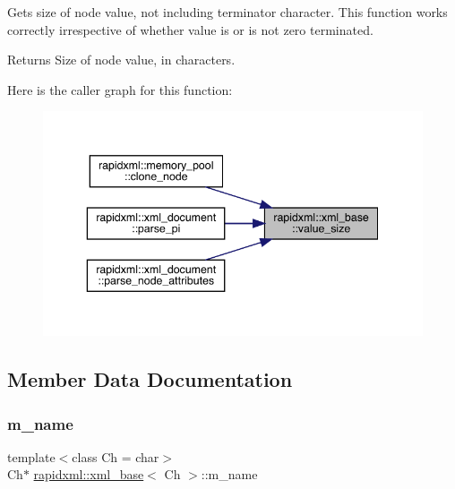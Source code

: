 Gets size of node value, not including terminator character. This function works correctly irrespective of whether value is or is not zero terminated. \begin{DoxyReturn}{Returns}
Size of node value, in characters. 
\end{DoxyReturn}
Here is the caller graph for this function\+:\nopagebreak
\begin{figure}[H]
\begin{center}
\leavevmode
\includegraphics[width=343pt]{classrapidxml_1_1xml__base_a2eb123d471b1567fa4832b6ee2b75493_icgraph}
\end{center}
\end{figure}


\subsection{Member Data Documentation}
\mbox{\label{classrapidxml_1_1xml__base_afd9851ed43e14619db0d7075ef8e9e8a}} 
\subsubsection{\texorpdfstring{m\_name}{m\_name}}
{\footnotesize\ttfamily template$<$class Ch  = char$>$ \\
Ch$\ast$ \mbox{\hyperlink{classrapidxml_1_1xml__base}{rapidxml\+::xml\+\_\+base}}$<$ Ch $>$\+::m\+\_\+name\hspace{0.3cm}{\ttfamily [protected]}}

\mbox{\label{classrapidxml_1_1xml__base_a5a8c76a7274b4180213796422c4df76f}} 
